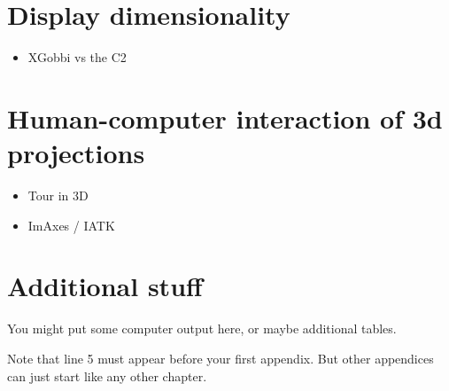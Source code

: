 \documentclass{monashthesis}
\begin{document}
\chapter{Display dimensionality}\label{ch:disp_dim}

\begin{itemize}
\tightlist
\item
  XGobbi vs the C2
\end{itemize}

\chapter{Human-computer interaction of 3d
projections}\label{ch:hci_3dproj}

\begin{itemize}
\tightlist
\item
  Tour in 3D
\item
  ImAxes / IATK
\end{itemize}

\appendix

\chapter{Additional stuff}\label{additional-stuff}

You might put some computer output here, or maybe additional tables.

Note that line 5 must appear before your first appendix. But other
appendices can just start like any other chapter.

\printbibliography[heading=bibintoc]
\end{document}
